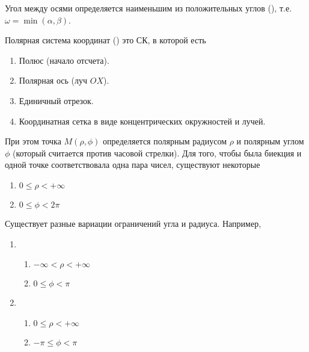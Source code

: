 Угол между осями определяется наименьшим из положительных углов
(), т.е. \(\omega = \min(\alpha, \beta)\).

\begin{definition}
  Полярная система координат () это СК, в которой есть
  
  \begin{enumerate}
  \item
    Полюс (начало отсчета).
  
  \item
    Полярная ось (луч \(OX\)).

  \item
    Единичный отрезок.

  \item
    Координатная сетка в виде концентрических окружностей и лучей.
  \end{enumerate}
\end{definition}


При этом точка \(M(\rho, \phi)\) определяется полярным радиусом \(\rho\) и
полярным углом \(\phi\) (который считается против часовой стрелки). Для того,
чтобы была биекция и одной точке соответствовала одна пара чисел, существуют
некоторые


\begin{enumerate}
\item
  \(0 \le \rho < +\infty\)

\item
  \(0 \le \phi < 2 \pi\)
\end{enumerate}
 
\begin{remark}
  Существует разные вариации ограничений угла и радиуса. Например,

  \begin{enumerate}
  \item
    \begin{enumerate}
    \item
      \(-\infty < \rho < +\infty\)

    \item
      \(0 \le \phi < \pi\)
    \end{enumerate}  

  \item
    \begin{enumerate}
      \item
        \(0 \le \rho < +\infty\)

      \item
        \(-\pi \le \phi < \pi\)
    \end{enumerate}
  \end{enumerate}
\end{remark}

